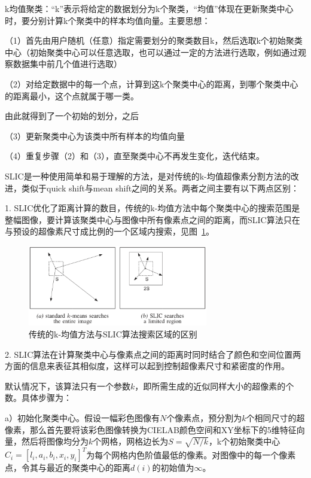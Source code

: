 \documentclass[12pt]{article}
\begin{document}
k均值聚类：“k”表示将给定的数据划分为k个聚类，“均值”体现在更新聚类中心时，要分别计算k个聚类中的样本均值向量。主要思想：

（1）首先由用户随机（任意）指定需要划分的聚类数目k，然后选取k个初始聚类中心（初始聚类中心可以任意选取，也可以通过一定的方法进行选取，例如通过观察数据集中前几个值进行选取）

（2）对给定数据中的每一个点，计算到这k个聚类中心的距离，到哪个聚类中心的距离最小，这个点就属于哪一类。

由此就得到了一个初始的划分，之后

（3）更新聚类中心为该类中所有样本的均值向量

（4）重复步骤（2）和（3），直至聚类中心不再发生变化，迭代结束。

SLIC是一种使用简单和易于理解的方法，是对传统的k-均值超像素分割方法的改进，类似于quick shift与mean shift之间的关系。两者之间主要有以下两点区别：

1. SLIC优化了距离计算的数目，传统的k-均值方法中每个聚类中心的搜索范围是整幅图像，要计算该聚类中心与图像中所有像素点之间的距离，而SLIC算法只在与预设的超像素尺寸成比例的一个区域内搜索，见图~\ref{fig: searchregion}。

\begin{figure}[!ht]
\centering
\includegraphics[width=0.7\textwidth]{searchregion.png}
\caption{传统的k-均值方法与SLIC算法搜索区域的区别}
\label{fig: searchregion}
\end{figure} 

2. SLIC算法在计算聚类中心与像素点之间的距离时同时结合了颜色和空间位置两方面的信息来表征其相似度，这样可以起到控制超像素尺寸和紧密度的作用。

默认情况下，该算法只有一个参数$k$，即所需生成的近似同样大小的超像素的个数。具体步骤为：

a）初始化聚类中心。假设一幅彩色图像有$N$个像素点，预分割为$k$个相同尺寸的超像素，那么首先要将该彩色图像转换为CIELAB颜色空间和XY坐标下的5维特征向量，然后将图像均分为$k$个网格，网格边长为$S=\sqrt{N/k}$，k个初始聚类中心$C_i=[l_i, a_i, b_i, x_i, y_i]^T$为每个网格内色阶值最低的像素。对图像中的每一个像素点，令其与最近的聚类中心的距离$d(i)$的初始值为$\infty$。
\end{document}
